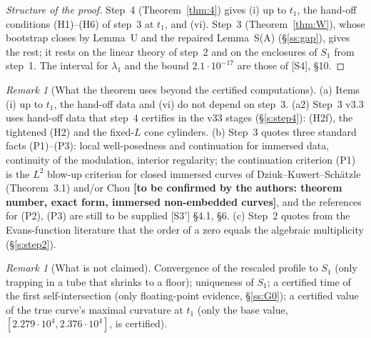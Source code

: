 \documentclass[11pt]{amsart}
\theoremstyle{definition}
\theoremstyle{remark}
\newtheorem{remark}[theorem]{Remark}
\newcommand{\dref}[1]{[\textsf{#1}]}
\begin{document}
\begin{proof}[Structure of the proof]
Step~4 (Theorem~\ref{thm:4}) gives (i) up to $t_1$, the hand-off conditions (H1)--(H6) of step~3 at $t_1$, and (vi). Step~3 (Theorem~\ref{thm:W}), whose bootstrap closes by Lemma~U and the repaired Lemma~S(A) (\S\ref{ss:gap}), gives the rest; it rests on the linear theory of step~2 and on the enclosures of $S_1$ from step~1. The interval for $\lambda_1$ and the bound $2.1\cdot10^{-17}$ are those of \dref{S4}, \S10.
\end{proof}

\begin{remark}[What the theorem uses beyond the certified computations]\label{rem:uses}
(a) Items (i) up to $t_1$, the hand-off data and (vi) do not depend on step~3. (a2) Step~3 v3.3 uses hand-off data that step~4 certifies in the v33 stages (\S\ref{s:step4}): (H2f), the tightened (H2) and the fixed-$L$ cone cylinders. (b) Step~3 quotes three standard facts (P1)--(P3): local well-posedness and continuation for immersed data, continuity of the modulation, interior regularity; the continuation criterion (P1) is the $L^2$ blow-up criterion for closed immersed curves of Dziuk--Kuwert--Sch\"atzle \cite{DziukKuwertSchatzle2002} (Theorem~3.1) and/or Chou \cite{Chou2003} \textbf{[to be confirmed by the authors: theorem number, exact form, immersed non-embedded curves]}, and the references for (P2), (P3) are still to be supplied \dref{S3'} \S4.1, \S6. (c) Step~2 quotes from the Evans-function literature that the order of a zero equals the algebraic multiplicity \cite{AlexanderGardnerJones1990,KapitulaPromislow2013,LatushkinSukhtayev2010} (\S\ref{s:step2}).
\end{remark}

\begin{remark}[What is not claimed]
Convergence of the rescaled profile to $S_1$ (only trapping in a tube that shrinks to a floor); uniqueness of $S_1$; a certified time of the first self-intersection (only floating-point evidence, \S\ref{ss:G0}); a certified value of the true curve's maximal curvature at $t_1$ (only the base value, $[2.279\cdot10^4,2.376\cdot10^4]$, is certified).
\end{remark}
\end{document}
